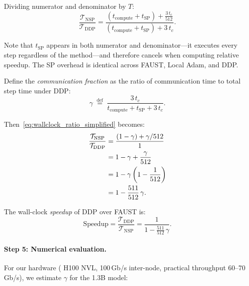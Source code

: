 \documentclass{article}
\begin{document}
Dividing numerator and denominator by $T$:
\begin{equation}
\frac{\mathcal{T}_{\text{NSP}}}{\mathcal{T}_{\text{DDP}}}
= \frac{(t_{\text{compute}} + t_{\text{SP}})
  + \frac{3\,t_c}{512}}
{(t_{\text{compute}} + t_{\text{SP}}) + 3\,t_c}.
\label{eq:wallclock_ratio_simplified}
\end{equation}

Note that $t_{\text{SP}}$ appears in both numerator and denominator---it
executes every step regardless of the method---and therefore cancels
when computing relative speedup. The SP overhead is identical across
FAUST, Local Adam, and DDP.

Define the \emph{communication fraction} as the ratio of communication
time to total step time under DDP:
\begin{equation}
\gamma \;\stackrel{\text{def}}{=}\;
\frac{3\,t_c}{t_{\text{compute}} + t_{\text{SP}} + 3\,t_c}.
\label{eq:gamma_def}
\end{equation}

Then~\eqref{eq:wallclock_ratio_simplified} becomes:
\begin{align}
\frac{\mathcal{T}_{\text{NSP}}}{\mathcal{T}_{\text{DDP}}}
&= \frac{(1-\gamma) + \gamma/512}{1}
\notag \\
&= 1 - \gamma + \frac{\gamma}{512}
\notag \\
&= 1 - \gamma\left(1 - \frac{1}{512}\right)
\notag \\
&= 1 - \frac{511}{512}\,\gamma.
\label{eq:wallclock_gamma}
\end{align}

The wall-clock \emph{speedup} of DDP over FAUST is:
\begin{equation}
\text{Speedup} = \frac{\mathcal{T}_{\text{DDP}}}{\mathcal{T}_{\text{NSP}}}
= \frac{1}{1 - \frac{511}{512}\,\gamma}.
\label{eq:speedup_general}
\end{equation}

\paragraph{Step 5: Numerical evaluation.}

For our hardware ( H100 NVL, 100\,Gb/s inter-node, practical
throughput 60--70\,Gb/s), we estimate $\gamma$ for the 1.3B model:
\end{document}
